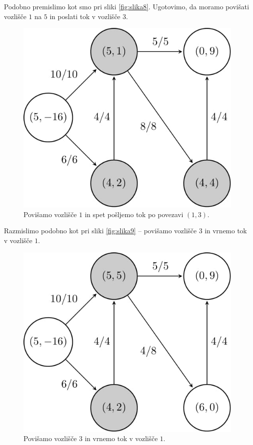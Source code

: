\documentclass[mat1]{fmfdelo}
\begin{document}
Podobno premislimo kot smo pri sliki \ref{fig:slika8}. Ugotovimo, da moramo povišati vozlišče $1$ na $5$ in poslati tok v vozlišče $3$.

\begin{figure}[H]
  \centering
  \includegraphics[scale=.358]{images/graf2-12/graf2-12-1.jpg}
  \caption{Povišamo vozlišče $1$ in spet pošljemo tok po povezavi $(1,3)$.}
\end{figure}

Razmislimo podobno kot pri sliki \ref{fig:slika9} -- povišamo vozlišče $3$ in vrnemo tok v vozlišče $1$.

\begin{figure}[H]
  \centering
  \includegraphics[scale=.358]{images/graf2-13/graf2-13-1.jpg}
  \caption{Povišamo vozlišče $3$ in vrnemo tok v vozlišče $1$.}
\end{figure}
\end{document}
